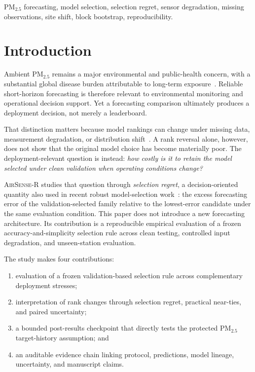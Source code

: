 \documentclass[journal]{IEEEtran}
\newcommand{\AirSense}{\textsc{AirSense-R}}
\begin{document}
\begin{IEEEkeywords}
PM$_{2.5}$ forecasting, model selection, selection regret, sensor degradation, missing observations, site shift, block bootstrap, reproducibility.
\end{IEEEkeywords}

\section{Introduction}
Ambient PM$_{2.5}$ remains a major environmental and public-health concern, with a substantial global disease burden attributable to long-term exposure~\cite{sang2022pm25burden}. Reliable short-horizon forecasting is therefore relevant to environmental monitoring and operational decision support. Yet a forecasting comparison ultimately produces a deployment decision, not merely a leaderboard.

That distinction matters because model rankings can change under missing data, measurement degradation, or distribution shift~\cite{alvaradoalcon2026citywide,liu2024distshift,han2024selection}. A rank reversal alone, however, does not show that the original model choice has become materially poor. The deployment-relevant question is instead: \emph{how costly is it to retain the model selected under clean validation when operating conditions change?}

\AirSense{} studies that question through \emph{selection regret}, a decision-oriented quantity also used in recent robust model-selection work~\cite{semper2026dss}: the excess forecasting error of the validation-selected family relative to the lowest-error candidate under the same evaluation condition. This paper does not introduce a new forecasting architecture. Its contribution is a reproducible empirical evaluation of a frozen accuracy-and-simplicity selection rule across clean testing, controlled input degradation, and unseen-station evaluation.

The study makes four contributions:
\begin{enumerate}[leftmargin=*,itemsep=2pt]
\item evaluation of a frozen validation-based selection rule across complementary deployment stresses;
\item interpretation of rank changes through selection regret, practical near-ties, and paired uncertainty;
\item a bounded post-results checkpoint that directly tests the protected PM$_{2.5}$ target-history assumption; and
\item an auditable evidence chain linking protocol, predictions, model lineage, uncertainty, and manuscript claims.
\end{enumerate}
\end{document}

